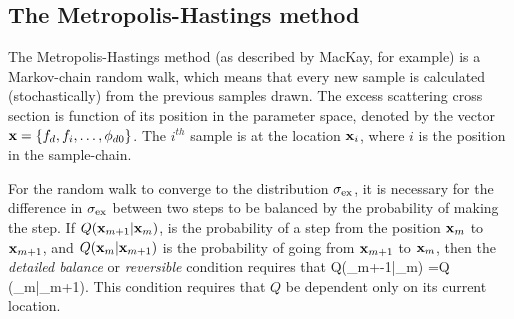 \subsection{The Metropolis-Hastings method} \label{sec:comp:montecarlo}
The Metropolis-Hastings method (as described by MacKay\cite{MacKayBook}, for example)  %
is a Markov-chain random walk, 
which means that every new sample is calculated (stochastically) from the previous samples drawn.
%
%
The excess scattering cross section is function of its position in the parameter space,
denoted by the vector $\mathbf{x}=\{{f_d},{f_i},\ldots, {\phi_{d0}}\}$.
The $i^{th}$ sample is at the location  $\mathbf{x}_i$,
where $i$ is the position in the sample-chain.
%

For the random walk to converge to the distribution $\sigma_\textrm{ex}$, 
it is necessary for the difference in $\sigma_\textrm{ex}$ between two steps to be balanced by the probability of making the step.
If $Q(\mathbf{x}_{m+1}|\mathbf{x}_m)$, is the probability of a step from  the position $\mathbf{x}_m$ to $\mathbf{x}_{m+1}$,
and $Q(\mathbf{x}_{m}|\mathbf{x}_{m+1})$ is the probability of going from  $\mathbf{x}_{m+1}$ to $\mathbf{x}_m$,
then the {\em detailed balance} or {\em reversible} condition  requires that
\eqa
{
    Q(\vx_{m+-1}|\vx_{m}) \excessI{}  =Q (\vx_{m}|\vx_{m+1})\excessI{}. 
}
This condition requires that $Q$ be dependent only on its current location.

